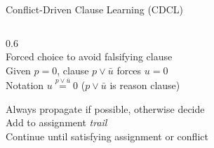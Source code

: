 \documentclass{cons-beamer}
\begin{document}
\begin{frame}{Conflict-Driven Clause Learning (CDCL)}
\begin{columns}
\begin{column}{0.6\textwidth}
			\textbf{}\\
			Forced choice to avoid falsifying clause\\
			Given $p=0$, clause $p \lor \bar{u}$ forces $u=0$\\
			Notation {$u \overset{p \lor \bar{u}}{=} 0$} ($p \lor \bar{u}$ is reason clause)\\[1em]
			\pause
			
			Always propagate if possible, otherwise decide\\
			Add to assignment \textit{trail}\\
			Continue until satisfying assignment or \textcolor{failpurple}{conflict}
		\end{column}
	\end{columns}
\end{frame}
\end{document}
